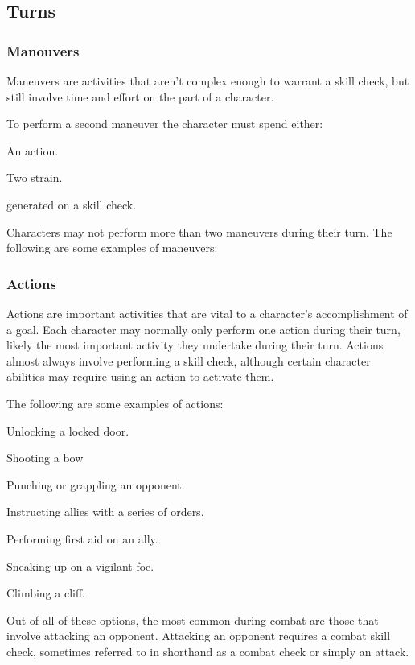\begin{multicols}{2}

\subsection{Turns}
\subsubsection{Manouvers}
Maneuvers are activities that aren’t complex enough to
warrant a skill check, but still involve time and effort
on the part of a character.

To perform a second maneuver the character must spend either:
\begin{description}
    \item An action.
    \item Two strain.
    \item \advantage\advantage generated on a skill check.
\end{description}

Characters may not perform more than two maneuvers during their turn.
The following are some examples of maneuvers:

\FloatBarrier

\subsubsection{Actions}
Actions are important activities that are vital to a character's accomplishment
of a goal. Each character may normally only perform one action during their
turn, likely the most important activity they undertake during their turn.
Actions almost always involve performing a skill check, although certain
character abilities may require using an action to activate them.

The following are some examples of actions:
\begin{description}
    \item Unlocking a locked door.
    \item Shooting a bow
    \item Punching or grappling an opponent.
    \item Instructing allies with a series of orders.
    \item Performing first aid on an ally.
    \item Sneaking up on a vigilant foe.
    \item Climbing a cliff.
\end{description}
Out of all of these options, the most common during combat are those that
involve attacking an opponent. Attacking an opponent requires a combat
skill check, sometimes referred to in shorthand as a combat check or
simply an attack.


\end{multicols}
